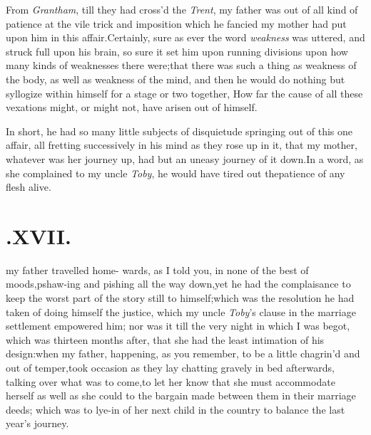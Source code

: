 \documentclass{article}
\begin{document}
From \textit{Grantham}, till they had cross’d the
\textit{Trent}, my father was out of all kind of patience at the vile
trick and imposition which he fancied my mother had put upon him in
this affair.\tsk  \lqq Certainly,\break 
{} 
sure as ever the word \textit{weakness} was uttered, and
struck full upon his brain,\tsh\break
so sure it set him upon running divisions upon how
many kinds of weaknesses there were;\tsh  that there was\break 
such a thing as weakness of the body,\break
\tsh  as well as weakness of the mind,\tsk\break
and then he would do nothing but syl\-logize within himself for a stage or
two
together, How far the cause of all these\break
vexations might, or might not, have\break
arisen out of himself.

In short, he had so many little subjects of disquietude
springing out of this one affair, all fretting successively in his
mind as they rose up in it, that my mother, whatever was her
journey up, had but an uneasy journey of it down.\tsh\break  In a
word, as she complained to my uncle \textit{Toby}, he would have
tired out the\break patience of any flesh alive.

\null
\section{.\enspace XVII.}

 my father travelled home-\break
wards, as I told you, in none of\break
the best of moods,\tsk  pshaw-ing and
pish\-ing all the way down,\tsk  yet he had the complaisance to keep
the worst part of the story still to himself;\tsk  which was the
resolution he had taken of doing himself the justice, which my
uncle \textit{Toby}’s clause in the marriage settlement
empowered him; nor was it till the very night in which I was begot,
which was thirteen months after, that she had the least intimation
of his design:\tsh when my father, happening, as you remember, to be a
little chagrin’d and out of temper,\tsh  took
occasion as they lay chatting gravely in bed afterwards, talking
over what was to come,\tsh  to let her know that she must
accommodate herself as well as she could to the bargain made
between them in their marriage deeds; which was to lye-in of her
next child in the country to balance the last year’s
journey.
\end{document}
